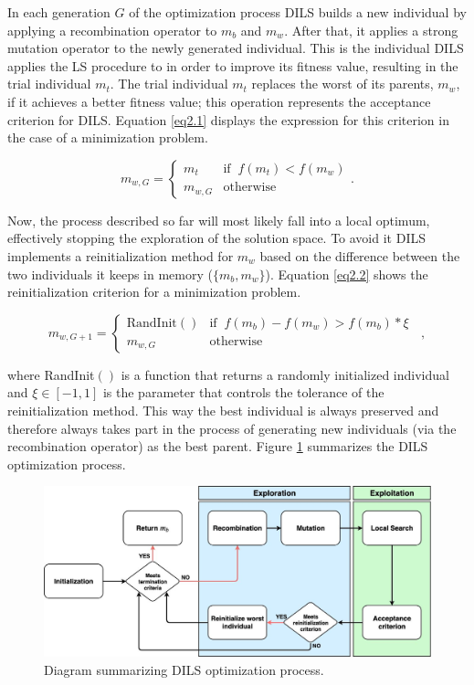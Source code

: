 In each generation $G$ of the optimization process \acs{DILS} builds a new individual by applying a recombination operator to $m_b$ and $m_w$. After that, it applies a strong mutation operator to the newly generated individual. This is the individual \acs{DILS} applies the \acs{LS} procedure to in order to improve its fitness value, resulting in the trial individual $m_t$. The trial individual $m_t$ replaces the worst of its parents, $m_w$, if it achieves a better fitness value; this operation represents the acceptance criterion for \acs{DILS}. Equation \ref{eq2.1} displays the expression for this criterion in the case of a minimization problem.

\begin{equation}
m_{w,G} = \left\{ \begin{array}{lc}
m_t &   \text{if} \;\; f(m_t) < f(m_w)\\
m_{w,G} &  \text{otherwise}
\end{array}
\right..
\label{eq2.1}
\end{equation}

Now, the process described so far will most likely fall into a local optimum, effectively stopping the exploration of the solution space. To avoid it \acs{DILS} implements a reinitialization method for $m_w$ based on the difference between the two individuals it keeps in memory ($\{m_b, m_w\}$). Equation \ref{eq2.2} shows the reinitialization criterion for a minimization problem.

\begin{equation}
m_{w,G+1} = \left\{ \begin{array}{lc}
\text{RandInit}() &   \text{if} \;\; f(m_b) - f(m_w) > f(m_b) * \xi \;\;\\
m_{w,G} &  \text{otherwise}
\end{array}
\right.,
\label{eq2.2}
\end{equation}

\noindent where RandInit$()$ is a function that returns a randomly initialized individual and $\xi \in [-1,1]$ is the parameter that controls the tolerance of the reinitialization method. This way the best individual is always preserved and therefore always takes part in the process of generating new individuals (via the recombination operator) as the best parent. Figure \ref{img:DILS_diag} summarizes the \acs{DILS} optimization process.

\begin{figure}[!h]
	\centering
	\includegraphics[scale=0.25]{gfx/NewProp/DILS/DILSDiagram.jpg}
	\caption{Diagram summarizing \acs{DILS} optimization process.}\label{img:DILS_diag}
\end{figure}

